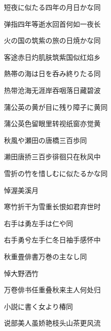 \begin{haiku}
    {\FH 短夜に似たる四年の月日かな}\hfill{\FH 同}

    {\FK 弹指四年等逝水回首何如一夜长}
\end{haiku}

\begin{haiku}
    {\FH 火の国の筑紫の旅の日焼かな}\hfill{\FH 同}

    {\FK 客途赤日灼肌肤筑紫国似红焰乡}
\end{haiku}

\begin{haiku}
    {\FH 熱帯の海は日を呑み終りたる}\hfill{\FH 同}

    {\FK 热带沧海无涯岸吞咽落日藏碧波}
\end{haiku}

\begin{haiku}
    {\FH 蒲公英の黄が目に残り障子に黄}\hfill{\FH 同}

    {\FK 蒲公英色留眼里转视纸窗亦觉黄}
\end{haiku}

\begin{haiku}
    {\FH 秋風や瀬田の唐橋三百歩}\hfill{\FH 同}

    {\FK 濑田唐挢三百步徘徊只在秋风中}
\end{haiku}

\begin{haiku}
    {\FH 雪折の竹を惜しむに似たるかな}\hfill{\FH 同}

    {\FK 悼渥美溪月}

    {\FK 寒竹折干为雪重长恨如君弃世时}
\end{haiku}

\begin{haiku}
    {\FH 右手は勇左手は仁や}\hfill{\FH 同}

    {\FK 右手勇兮左手仁冬日袖手感怀中}
\end{haiku}

\begin{haiku}
    {\FH 秋重畳俳書万巻の主なし}\hfill{\FH 同}

    {\FK 悼大野洒竹}

    {\FK 万卷俳书任重叠秋来主人何处归}
\end{haiku}

\begin{haiku}
    {\FH 小説に書く女より椿}\hfill{\FH 同}

    {\FK 说部美人虽娇艳枝头山茶更风流}
\end{haiku}


